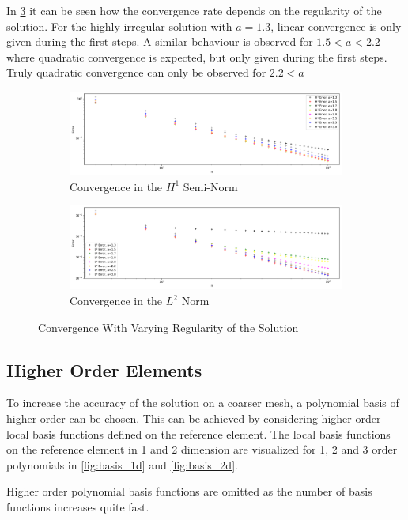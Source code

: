 \documentclass[11pt,a4paper]{article}
\begin{document}
In \ref{fig:err_nonsmooth_l2} it can be seen how the convergence rate depends on the regularity of the solution.
For the highly irregular solution with $a = 1.3$, linear convergence is only given during the first steps.
A similar behaviour is observed for $1.5 < a < 2.2$ where quadratic convergence is expected, but only given
during the first steps.
Truly quadratic convergence can only be observed for $2.2 < a$
\begin{figure}
  \centering
  \begin{subfigure}{1\textwidth}
    \centering
    \includegraphics[width=.8\linewidth]{errors_nonsmooth_h1}
    \caption{Convergence in the $H^1$ Semi-Norm}
    \label{fig:err_nonsmooth_h1}
  \end{subfigure}

  \begin{subfigure}{1\textwidth}
    \centering
    \includegraphics[width=.8\linewidth]{errors_nonsmooth_l2}
    \caption{Convergence in the $L^2$ Norm}
    \label{fig:err_nonsmooth_l2}
  \end{subfigure}
  \caption{Convergence With Varying Regularity of the Solution}
\end{figure}


\subsection*{Higher Order Elements}
To increase the accuracy of the solution on a coarser mesh, a polynomial basis
of higher order can be chosen. This can be achieved by considering higher order local
basis functions defined on the reference element. The local basis functions on the reference
element in 1 and 2 dimension are visualized for 1, 2 and 3 order polynomials in \ref{fig:basis_1d}
and \ref{fig:basis_2d}.

Higher order polynomial basis functions are omitted as the number of basis functions increases quite fast.
\end{document}
